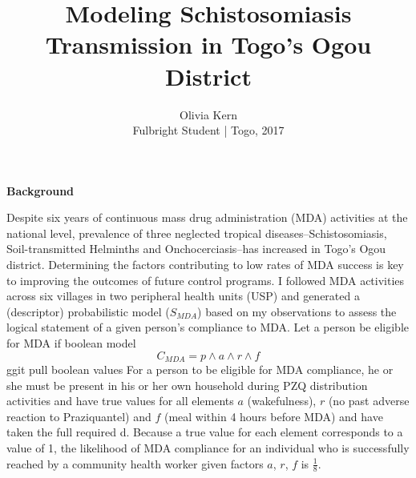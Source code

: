 \documentclass[12pt]{article}
\begin{document}
 

 
 
\title{Modeling Schistosomiasis Transmission in Togo's Ogou District}
\author{Olivia Kern\\
Fulbright Student | Togo, 2017} 
 
\maketitle \textbf{Background}

Despite six years of continuous mass drug administration (MDA) activities at the national level, prevalence of three neglected tropical diseases--Schistosomiasis, Soil-transmitted Helminths and Onchocerciasis--has increased in Togo's Ogou district. Determining the factors contributing to low rates of MDA success is key to improving the outcomes of future control programs. I followed MDA activities across six villages in two peripheral health units (USP) and generated a (descriptor) probabilistic model  ($S_{MDA}$) based on my observations to assess the logical statement of a given person's compliance to MDA. 
Let a person be eligible for MDA if 
boolean model 
\begin{equation}\label{eq:probMDA}
 C_{MDA} = p \wedge a \wedge r \wedge f
\end{equation}
ggit pull
boolean values
 For a person to be eligible for MDA compliance, he or she must be present in his or her own household during PZQ distribution activities and have true values for all elements $a$ (wakefulness), $r$ (no past adverse reaction to Praziquantel) and $f$ (meal within 4 hours before MDA) and have taken the full required d. Because a true value for each element corresponds to a value of 1,
 the likelihood of  MDA compliance for an individual who is successfully reached by a community health worker given factors $a$, $r$, $f$ is $\frac{1}{8}$.
\linebreak
\end{document}
